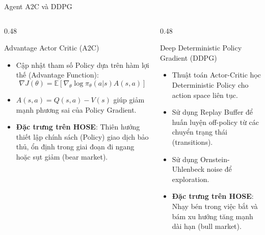 \documentclass[10pt,aspectratio=169]{beamer}
\begin{document}
\begin{frame}{Agent A2C và DDPG}
  \begin{columns}[t]
    \begin{column}{0.48\textwidth}
      \begin{block}{Advantage Actor Critic (A2C)}
        \begin{itemize}
          \item Cập nhật tham số Policy dựa trên hàm lợi thế (Advantage Function):
          $$\nabla J(\theta) = \mathbb{E}[\nabla_\theta \log \pi_\theta(a|s) A(s, a)]$$
          \item $A(s, a) = Q(s, a) - V(s)$ giúp giảm mạnh phương sai của Policy Gradient.
          \item \textbf{Đặc trưng trên HOSE}: Thiên hướng thiết lập chính sách (Policy) giao dịch bảo thủ, ổn định trong giai đoạn đi ngang hoặc sụt giảm (bear market).
        \end{itemize}
      \end{block}
    \end{column}
    
    \begin{column}{0.48\textwidth}
      \begin{block}{Deep Deterministic Policy Gradient (DDPG)}
        \begin{itemize}
          \item Thuật toán Actor-Critic học Deterministic Policy cho action space liên tục.
          \item Sử dụng Replay Buffer để huấn luyện off-policy từ các chuyển trạng thái (transitions).
          \item Sử dụng Ornstein-Uhlenbeck noise để exploration.
          \item \textbf{Đặc trưng trên HOSE}: Nhạy bén trong việc bắt và bám xu hướng tăng mạnh dài hạn (bull market).
        \end{itemize}
      \end{block}
    \end{column}
  \end{columns}
\end{frame}
\end{document}
